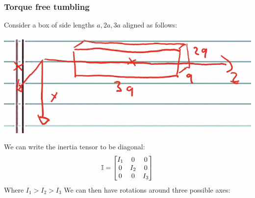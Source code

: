 \subsubsection{Torque free tumbling}
Consider a box of side lengths $a, 2a, 3a$ aligned as follows:
\begin{center}
    \includegraphics[scale=0.7]{Lecture-19/l19-img2.png}
\end{center}
We can write the inertia tensor to be diagonal:
\[\mathbb{I} = \begin{bmatrix}I_1 & 0 & 0 \\ 0 & I_2 & 0 \\ 0 & 0 & I_3\end{bmatrix}\]
Where $I_1 > I_2 > I_3$ We can then have rotations around three possible axes:
